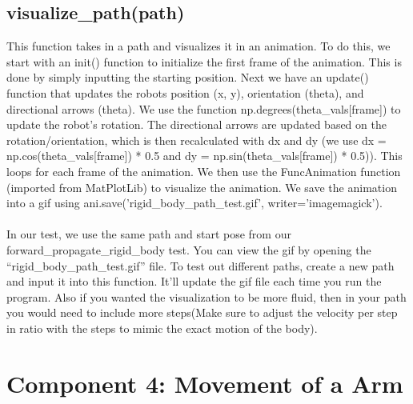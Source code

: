 \documentclass[12pt]{article}
\begin{document}
\subsection*{visualize\_path(path)}
This function takes in a path and visualizes it in an animation. To do this, we start with an init() function to initialize the first frame of the animation. This is done by simply inputting the starting position. Next we have an update() function that updates the robots position (x, y), orientation (theta), and directional arrows (theta). We use the function np.degrees(theta\_vals[frame]) to update the robot's rotation. The directional arrows are updated based on the rotation/orientation, which is then recalculated with dx and dy (we use dx = np.cos(theta\_vals[frame]) * 0.5 and dy = np.sin(theta\_vals[frame]) * 0.5)). This loops for each frame of the animation. We then use the FuncAnimation function (imported from MatPlotLib) to visualize the animation. We save the animation into a gif using ani.save('rigid\_body\_path\_test.gif', writer='imagemagick').
\\ \\
In our test, we use the same path and start pose from our forward\_propagate\_rigid\_body test. You can view the gif by opening the “rigid\_body\_path\_test.gif” file. To test out different paths, create a new path and input it into this function. It’ll update the gif file each time you run the program. Also if you wanted the visualization to be more fluid, then in your path you would need to include more steps(Make sure to adjust the velocity per step in ratio with the steps to mimic the exact motion of the body).

\section*{Component 4: Movement of a Arm}
\end{document}
